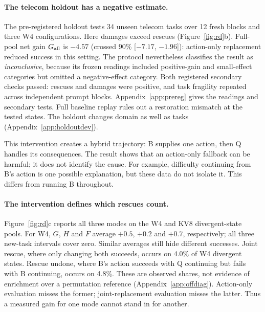 \paragraph{The telecom holdout has a negative estimate.} The pre-registered holdout tests 34 unseen telecom tasks over 12 fresh blocks and three W4 configurations. Here damages exceed rescues (Figure~\ref{fig:rd}b). Full-pool net gain $G_{\mathrm{all}}$ is $-4.57$\pp{} (crossed 90\% [$-7.17$, $-1.96$]): action-only replacement reduced success in this setting. The protocol nevertheless classifies the result as \emph{inconclusive}, because its frozen readings included positive-gain and small-effect categories but omitted a negative-effect category. Both registered secondary checks passed: rescues and damages were positive, and task fragility repeated across independent prompt blocks. Appendix~\ref{app:prereg} gives the readings and secondary tests. %
Full baseline replay rules out a restoration mismatch at the tested states. The holdout changes domain as well as tasks (Appendix~\ref{app:holdoutdev}). %

This intervention creates a hybrid trajectory: B supplies one action, then Q handles its consequences. The result shows that an action-only fallback can be harmful; it does not identify the cause. For example, difficulty continuing from B's action is one possible explanation, but these data do not isolate it. This differs from running B throughout.

\paragraph{The intervention defines which rescues count.} Figure~\ref{fig:rd}c reports all three modes on the W4 and KV8 divergent-state pools. For W4, $G$, $H$ and $F$ average $+0.5$, $+0.2$ and $+0.7$\pp{}, respectively; all three new-task intervals cover zero. Similar averages still hide different successes. Joint rescue, where only changing both succeeds, occurs on 4.0\% of W4 divergent states. Rescue undone, where B's action succeeds with Q continuing but fails with B continuing, occurs on 4.8\%. These are observed shares, not evidence of enrichment over a permutation reference (Appendix~\ref{app:offdiag}). Action-only evaluation misses the former; joint-replacement evaluation misses the latter. Thus a measured gain for one mode cannot stand in for another.

